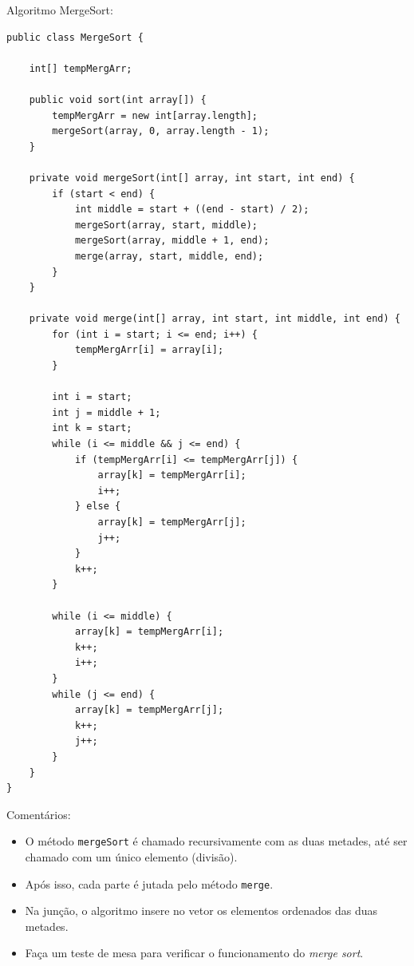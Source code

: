 Algoritmo MergeSort:
\begin{verbatim}
public class MergeSort {
	
	int[] tempMergArr;
	
	public void sort(int array[]) {
		tempMergArr = new int[array.length];
		mergeSort(array, 0, array.length - 1);
	}
	
	private void mergeSort(int[] array, int start, int end) {
		if (start < end) {
			int middle = start + ((end - start) / 2);
			mergeSort(array, start, middle);
			mergeSort(array, middle + 1, end);
			merge(array, start, middle, end);
		}
	}
	
	private void merge(int[] array, int start, int middle, int end) {		
		for (int i = start; i <= end; i++) {
			tempMergArr[i] = array[i];
		}
		
		int i = start;
		int j = middle + 1;
		int k = start;
		while (i <= middle && j <= end) {
			if (tempMergArr[i] <= tempMergArr[j]) {
				array[k] = tempMergArr[i];
				i++;
			} else {
				array[k] = tempMergArr[j];
				j++;
			}
			k++;
		}

		while (i <= middle) {
			array[k] = tempMergArr[i];
			k++;
			i++;
		}
		while (j <= end) {
			array[k] = tempMergArr[j];
			k++;
			j++;
		}		
	}
}
\end{verbatim}
	
\medskip

{\color{redtext}
	Comentários:
	\begin{itemize}
		\item O método \texttt{mergeSort} é chamado recursivamente com as duas metades, até ser chamado com um único elemento (divisão).
		\item Após isso, cada parte é jutada pelo método \texttt{merge}.
		\item Na junção, o algoritmo insere no vetor os elementos ordenados das duas metades.
		\item Faça um teste de mesa para verificar o funcionamento do \textit{merge sort}.
	\end{itemize}
}

\medskip


